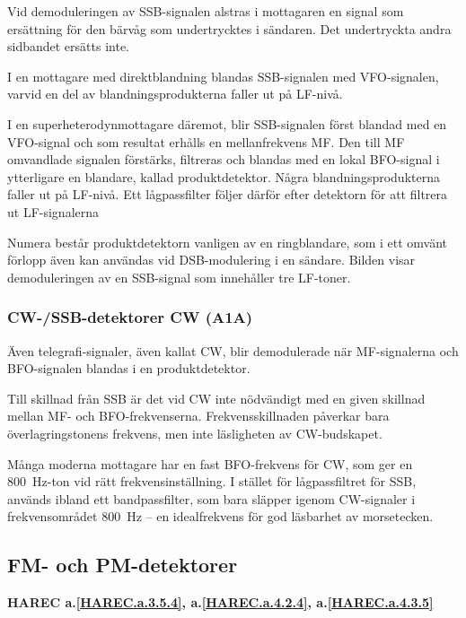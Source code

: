 Vid demoduleringen av SSB-signalen alstras i mottagaren en signal som
ersättning för den bärvåg som undertrycktes i sändaren. Det
undertryckta andra sidbandet ersätts inte.

I en mottagare med direktblandning blandas SSB-signalen med
VFO-signalen, varvid en del av blandningsprodukterna faller ut på
LF-nivå.

I en superheterodynmottagare däremot, blir SSB-signalen först blandad
med en VFO-signal och som resultat erhålls en mellanfrekvens MF. Den
till MF omvandlade signalen förstärks, filtreras och blandas med en
lokal BFO-signal i ytterligare en blandare, kallad
produktdetektor. Några blandningsprodukterna faller ut på LF-nivå. Ett
lågpassfilter följer därför efter detektorn för att filtrera ut
LF-signalerna

Numera består produktdetektorn vanligen av en ringblandare, som i ett
omvänt förlopp även kan användas vid DSB-modulering i en
sändare. Bilden visar demoduleringen av en SSB-signal som innehåller
tre LF-toner.

\subsubsection{CW-/SSB-detektorer CW (A1A)}

Även telegrafi-signaler, även kallat CW, blir demodulerade när
MF-signalerna och BFO-signalen blandas i en produktdetektor.

Till skillnad från SSB är det vid CW inte nödvändigt med en given
skillnad mellan MF- och BFO-frekvenserna. Frekvensskillnaden påverkar
bara överlagringstonens frekvens, men inte läsligheten av
CW-budskapet.

Många moderna mottagare har en fast BFO-frekvens för CW, som ger en
800~Hz-ton vid rätt frekvensinställning. I stället för lågpassfiltret
för SSB, används ibland ett bandpassfilter, som bara släpper igenom
CW-signaler i frekvensområdet 800~Hz -- en idealfrekvens för god
läsbarhet av morsetecken.

\subsection{FM- och PM-detektorer}
\textbf{
HAREC a.\ref{HAREC.a.3.5.4}\label{myHAREC.a.3.5.4},
 a.\ref{HAREC.a.4.2.4}\label{myHAREC.a.4.2.4},
 a.\ref{HAREC.a.4.3.5}\label{myHAREC.a.4.3.5}
}

